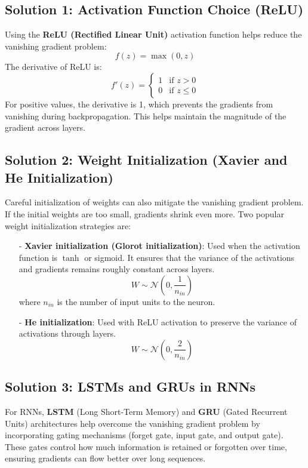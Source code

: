 \documentclass[10pt]{article}
\begin{document}
\subsection{ Solution 1: Activation Function Choice (ReLU)}
Using the {\bf ReLU (Rectified Linear Unit)} activation function helps reduce the vanishing gradient problem:
\[
f(z) = \max(0, z)
\]
The derivative of ReLU is:
\[
f'(z) = \begin{cases} 
1 & \text{if } z > 0 \\
0 & \text{if } z \leq 0
\end{cases}
\]
For positive values, the derivative is 1, which prevents the gradients from vanishing during backpropagation. This helps maintain the magnitude of the gradient across layers.

\subsection{ Solution 2: Weight Initialization (Xavier and He Initialization)}
Careful initialization of weights can also mitigate the vanishing gradient problem. If the initial weights are too small, gradients shrink even more. Two popular weight initialization strategies are:

\begin{itemize}
   \item [-] {\bf Xavier initialization (Glorot initialization)}: Used when the activation function is \( \tanh \) or sigmoid. It ensures that the variance of the activations and gradients remains roughly constant across layers.
     \[
     W \sim \mathcal{N}(0, \frac{1}{n_{in}})
     \]
     where \(n_{in}\) is the number of input units to the neuron.
   
   \item [-] {\bf He initialization}: Used with ReLU activation to preserve the variance of activations through layers.
     \[
     W \sim \mathcal{N}(0, \frac{2}{n_{in}})
     \]
     
\end{itemize}
\subsection{ Solution 3: LSTMs and GRUs in RNNs}
For RNNs, {\bf LSTM} (Long Short-Term Memory) and {\bf GRU} (Gated Recurrent Units) architectures help overcome the vanishing gradient problem by incorporating gating mechanisms (forget gate, input gate, and output gate). These gates control how much information is retained or forgotten over time, ensuring gradients can flow better over long sequences.
\end{document}
